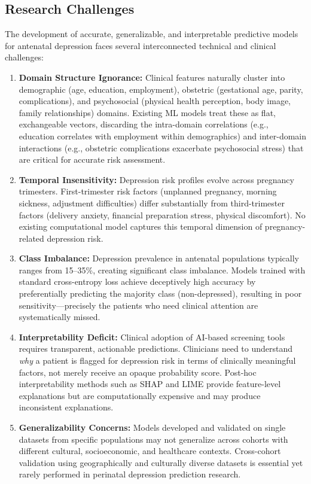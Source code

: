 \documentclass[12pt,a4paper]{article}
\begin{document}
\subsection{Research Challenges}

The development of accurate, generalizable, and interpretable predictive models for antenatal depression faces several interconnected technical and clinical challenges:

\begin{enumerate}[label=\textbf{C\arabic*:}]
    \item \textbf{Domain Structure Ignorance:} Clinical features naturally cluster into demographic (age, education, employment), obstetric (gestational age, parity, complications), and psychosocial (physical health perception, body image, family relationships) domains. Existing ML models treat these as flat, exchangeable vectors, discarding the intra-domain correlations (e.g., education correlates with employment within demographics) and inter-domain interactions (e.g., obstetric complications exacerbate psychosocial stress) that are critical for accurate risk assessment.
    
    \item \textbf{Temporal Insensitivity:} Depression risk profiles evolve across pregnancy trimesters. First-trimester risk factors (unplanned pregnancy, morning sickness, adjustment difficulties) differ substantially from third-trimester factors (delivery anxiety, financial preparation stress, physical discomfort). No existing computational model captures this temporal dimension of pregnancy-related depression risk.
    
    \item \textbf{Class Imbalance:} Depression prevalence in antenatal populations typically ranges from 15--35\%, creating significant class imbalance. Models trained with standard cross-entropy loss achieve deceptively high accuracy by preferentially predicting the majority class (non-depressed), resulting in poor sensitivity---precisely the patients who need clinical attention are systematically missed.
    
    \item \textbf{Interpretability Deficit:} Clinical adoption of AI-based screening tools requires transparent, actionable predictions\cite{amann2020}. Clinicians need to understand \textit{why} a patient is flagged for depression risk in terms of clinically meaningful factors, not merely receive an opaque probability score. Post-hoc interpretability methods such as SHAP\cite{lundberg2017} and LIME\cite{ribeiro2016} provide feature-level explanations but are computationally expensive and may produce inconsistent explanations.
    
    \item \textbf{Generalizability Concerns:} Models developed and validated on single datasets from specific populations may not generalize across cohorts with different cultural, socioeconomic, and healthcare contexts. Cross-cohort validation using geographically and culturally diverse datasets is essential yet rarely performed in perinatal depression prediction research.
\end{enumerate}
\end{document}
